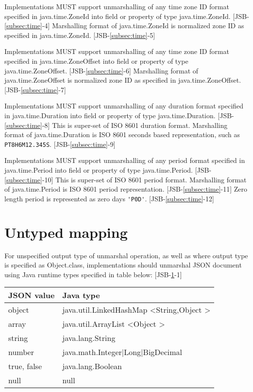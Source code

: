 Implementations MUST support unmarshalling of any time zone ID format specified in java.time.ZoneId into field or property of type java.time.ZoneId. [JSB-\ref{subsec:time}-4]
Marshalling format of java.time.ZoneId is normalized zone ID as specified in java.time.ZoneId. [JSB-\ref{subsec:time}-5]

Implementations MUST support unmarshalling of any time zone ID format specified in java.time.ZoneOffset into field or property of type java.time.ZoneOffset. [JSB-\ref{subsec:time}-6]
Marshalling format of java.time.ZoneOffset is normalized zone ID as specified in java.time.ZoneOffset. [JSB-\ref{subsec:time}-7]

Implementations MUST support unmarshalling of any duration format specified in java.time.Duration into field or property of type java.time.Duration. [JSB-\ref{subsec:time}-8] This is super-set of ISO 8601 duration format.
Marshalling format of java.time.Duration is ISO 8601 seconds based representation, such as
\verb|PT8H6M12.345S|. [JSB-\ref{subsec:time}-9]

Implementations MUST support unmarshalling of any period format specified in java.time.Period into field or property of type java.time.Period. [JSB-\ref{subsec:time}-10] This is super-set of ISO 8601 period format.
Marshalling format of java.time.Period is ISO 8601 period representation. [JSB-\ref{subsec:time}-11] Zero length period is represented as zero days \verb|'P0D'|. [JSB-\ref{subsec:time}-12]


\section{Untyped mapping}
\label{sec:untyped}
For unspecified output type of unmarshal operation, as well as where output type is specified as Object.class, implementations should unmarshal JSON document using Java runtime types specified in table below: [JSB-\ref{sec:untyped}-1]

\begin{tabularx}{\textwidth}{ |X|X| }
\hline
JSON value & Java type \\ 
\hline
object & java.util.LinkedHashMap \textless String,Object \textgreater\\
array & java.util.ArrayList \textless Object \textgreater \\
string & java.lang.String \\
number & java.math.Integer|Long|BigDecimal \\
true, false & java.lang.Boolean \\
null & null \\
\hline
\end{tabularx}

